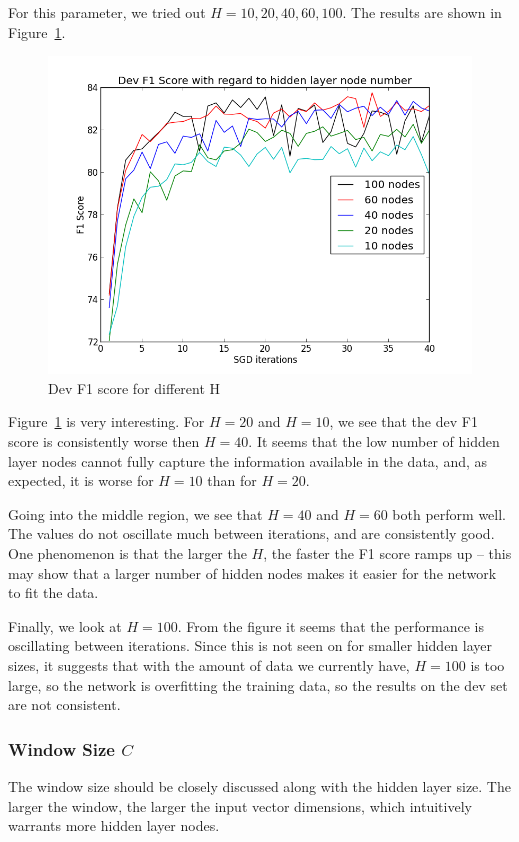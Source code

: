 \documentclass[12pt, twocolumn]{article}
\begin{document}
For this parameter, we tried out $H=10,20,40,60,100$. The results are shown in Figure~\ref{fig:hidden}.
\begin{figure}[H]
\centering
\includegraphics[width = \linewidth]{plots/hidden}
\caption{Dev F1 score for different H}
\label{fig:hidden}
\end{figure}
Figure~\ref{fig:hidden} is very interesting. For $H=20$ and $H=10$, we see that the dev F1 score is consistently worse then $H=40$. It seems that the low number of hidden layer nodes cannot fully capture the information available in the data, and, as expected, it is worse for $H=10$ than for $H=20$.

Going into the middle region, we see that $H=40$ and $H=60$ both perform well. The values do not oscillate much between iterations, and are consistently good. One phenomenon is that the larger the $H$, the faster the F1 score ramps up -- this may show that a larger number of hidden nodes makes it easier for the network to fit the data.

Finally, we look at $H=100$. From the figure it seems that the performance is oscillating between iterations. Since this is not seen on for smaller hidden layer sizes, it suggests that with the amount of data we currently have, $H=100$ is too large, so the network is overfitting the training data, so the results on the dev set are not consistent.
\subsubsection{Window Size $C$}
The window size should be closely discussed along with the hidden layer size. The larger the window, the larger the input vector dimensions, which intuitively warrants more hidden layer nodes.
\end{document}
